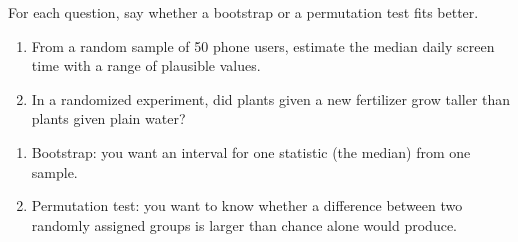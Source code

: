 \begin{Exercise}[title={Bootstrap or Permutation?}, label=si_which]
For each question, say whether a bootstrap or a permutation test fits better.
\begin{enumerate}
\item From a random sample of 50 phone users, estimate the median daily screen time with a range of
plausible values.
\item In a randomized experiment, did plants given a new fertilizer grow taller than plants given
plain water?
\end{enumerate}
\end{Exercise}
\begin{Answer}[ref=si_which]
\begin{enumerate}
\item Bootstrap: you want an interval for one statistic (the median) from one sample.
\item Permutation test: you want to know whether a difference between two randomly assigned groups is
larger than chance alone would produce.
\end{enumerate}
\end{Answer}
